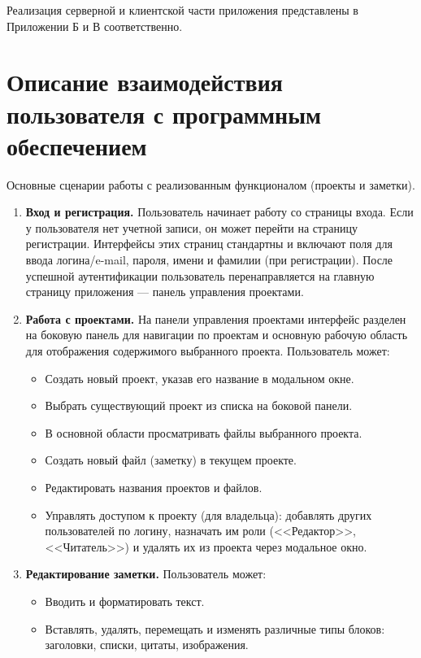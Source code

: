 \clearpage
Реализация серверной и клиентской части приложения представлены в Приложении Б и В соответственно.

\section{Описание взаимодействия пользователя с программным обеспечением}

Основные сценарии работы с реализованным функционалом (проекты и заметки).

\begin{enumerate}[wide=12.5mm, leftmargin=12.5mm]
    \item \textbf{Вход и регистрация.}
    Пользователь начинает работу со страницы входа. Если у пользователя нет учетной записи, он может перейти на страницу регистрации. Интерфейсы этих страниц стандартны и включают поля для ввода логина/e-mail, пароля, имени и фамилии (при регистрации). После успешной аутентификации пользователь перенаправляется на главную страницу приложения — панель управления проектами.
    \item \textbf{Работа с проектами.}
    На панели управления проектами интерфейс разделен на боковую панель для навигации по проектам и основную рабочую область для отображения содержимого выбранного проекта.
    Пользователь может:
    \begin{itemize}[wide=12.5mm, leftmargin=12.5mm]
        \item Создать новый проект, указав его название в модальном окне.
        \item Выбрать существующий проект из списка на боковой панели.
        \item В основной области просматривать файлы выбранного проекта.
        \item Создать новый файл (заметку) в текущем проекте.
        \item Редактировать названия проектов и файлов.
        \item Управлять доступом к проекту (для владельца): добавлять других пользователей по логину, назначать им роли (<<Редактор>>, <<Читатель>>) и удалять их из проекта через модальное окно.
    \end{itemize}
    \item \textbf{Редактирование заметки.} Пользователь может:
    \begin{itemize}[wide=12.5mm, leftmargin=12.5mm]
        \item Вводить и форматировать текст.
        \item Вставлять, удалять, перемещать и изменять различные типы блоков: заголовки, списки, цитаты, изображения.
    \end{itemize}
\end{enumerate}

